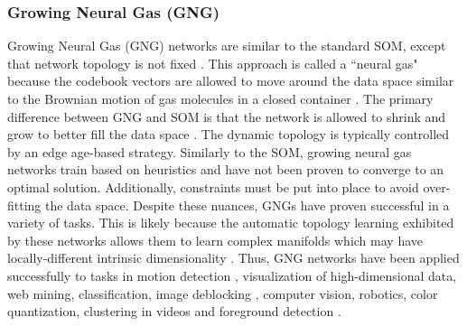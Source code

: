 \subsubsection{Growing Neural Gas (GNG)} \label{sec:GNG}
Growing Neural Gas (GNG) networks \citep{Fritzke1995GrowingNeuralGas} are similar to the standard SOM, except that network topology is not fixed \citep{Sorzano2014DRReview}.  This approach is called a ``neural gas" because the codebook vectors are allowed to move around the data space similar to the Brownian motion of gas molecules in a closed container \citep{Pena2007NeuralGasReview}.  The primary difference between GNG and SOM is that the network is allowed to shrink and grow to better fill the data space \citep{Palomo2017GHNG,Palomo2016GrowingNeuralForest}.  The dynamic topology is typically controlled by an edge age-based strategy.  Similarly to the SOM, growing neural gas networks train based on heuristics and have not been proven to converge to an optimal solution.  Additionally, constraints must be put into place to avoid over-fitting the data space.  Despite these nuances, GNGs have proven successful in a variety of tasks.  This is likely because the automatic topology learning exhibited by these networks allows them to learn complex manifolds which may have locally-different intrinsic dimensionality \citep{Kegl2008PrincipalManifoldsTextbook}.  Thus, GNG networks have been applied successfully to tasks in motion detection \citep{Sun2016GNGMotionDetection}, visualization of high-dimensional data, web mining, classification, image deblocking \citep{LopezRubio2011GHPGraphs}, computer vision, robotics, color quantization, clustering in videos \citep{Palomo2017GHNG} and foreground detection \citep{Palomo2016GrowingNeuralForest}.

 
